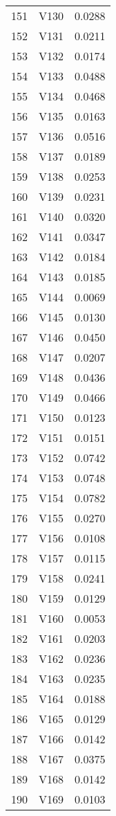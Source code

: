 \documentclass{amsart}
\begin{document}
\begin{longtable}{rlr}
  151 & V130 & 0.0288 \\ 
  152 & V131 & 0.0211 \\ 
  153 & V132 & 0.0174 \\ 
  154 & V133 & 0.0488 \\ 
  155 & V134 & 0.0468 \\ 
  156 & V135 & 0.0163 \\ 
  157 & V136 & 0.0516 \\ 
  158 & V137 & 0.0189 \\ 
  159 & V138 & 0.0253 \\ 
  160 & V139 & 0.0231 \\ 
  161 & V140 & 0.0320 \\ 
  162 & V141 & 0.0347 \\ 
  163 & V142 & 0.0184 \\ 
  164 & V143 & 0.0185 \\ 
  165 & V144 & 0.0069 \\ 
  166 & V145 & 0.0130 \\ 
  167 & V146 & 0.0450 \\ 
  168 & V147 & 0.0207 \\ 
  169 & V148 & 0.0436 \\ 
  170 & V149 & 0.0466 \\ 
  171 & V150 & 0.0123 \\ 
  172 & V151 & 0.0151 \\ 
  173 & V152 & 0.0742 \\ 
  174 & V153 & 0.0748 \\ 
  175 & V154 & 0.0782 \\ 
  176 & V155 & 0.0270 \\ 
  177 & V156 & 0.0108 \\ 
  178 & V157 & 0.0115 \\ 
  179 & V158 & 0.0241 \\ 
  180 & V159 & 0.0129 \\ 
  181 & V160 & 0.0053 \\ 
  182 & V161 & 0.0203 \\ 
  183 & V162 & 0.0236 \\ 
  184 & V163 & 0.0235 \\ 
  185 & V164 & 0.0188 \\ 
  186 & V165 & 0.0129 \\ 
  187 & V166 & 0.0142 \\ 
  188 & V167 & 0.0375 \\ 
  189 & V168 & 0.0142 \\ 
  190 & V169 & 0.0103 \\ 

\end{longtable}
\end{document}

